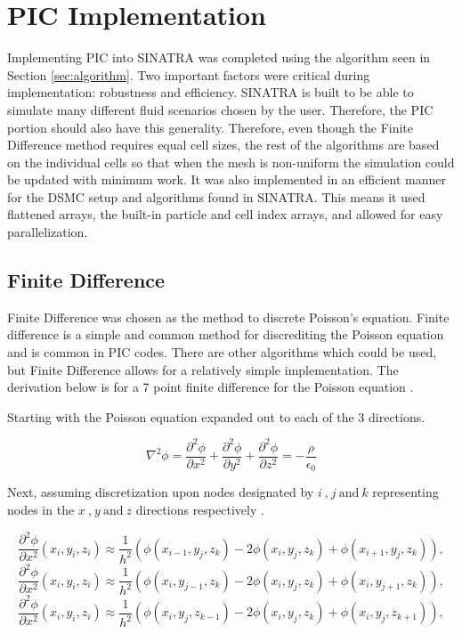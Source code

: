\section{PIC Implementation}

Implementing PIC into SINATRA was completed using the algorithm seen in Section \ref{sec:algorithm}. Two important factors were critical during implementation: robustness and efficiency. SINATRA is built to be able to simulate many different fluid scenarios chosen by the user. Therefore, the PIC portion should also have this generality. Therefore, even though the Finite Difference method requires equal cell sizes, the rest of the algorithms are based on the individual cells so that when the mesh is non-uniform the simulation could be updated with minimum work. It was also implemented in an efficient manner for the DSMC setup and algorithms found in SINATRA. This means it used flattened arrays, the built-in particle and cell index arrays, and allowed for easy parallelization. 

\subsection{Finite Difference}
\label{sec:finite_diff}

\indent Finite Difference was chosen as the method to discrete Poisson's equation. Finite difference is a simple and common method for discrediting the Poisson equation and is common in PIC codes. There are other algorithms which could be used, but Finite Difference allows for a relatively simple implementation. The derivation below is for a 7 point finite difference for the Poisson equation \cite{FD_GS} \cite{FDM}.

Starting with the Poisson equation expanded out to each of the 3 directions. 

\begin{equation}
    \label{eqn:poisson_expanded}
    \nabla^2 \phi = \frac{\partial^2 \phi}{\partial x^2} + \frac{\partial^2 \phi}{\partial y^2} + \frac{\partial^2 \phi}{\partial z^2} = - \frac{\rho}{\epsilon_0}
\end{equation}

Next, assuming discretization upon nodes designated by \(i \: \text{,} \: j \: \text{and} \: k\) representing nodes in the \(x \: \text{,} \: y \: \text{and} \: z\) directions respectively \cite{FD_GS}. 

\begin{equation}
    \label{eqn:x_partial}
    \frac{\partial^2 \phi}{\partial x^2}(x_i,y_i,z_i) \approx \frac{1}{h^2}(\phi(x_{i-1},y_j,z_k) - 2\phi(x_i,y_j,z_k) + \phi(x_{i+1},y_j,z_k)),
\end{equation}
\begin{equation}
    \label{eqn:y_partial}
    \frac{\partial^2 \phi}{\partial x^2}(x_i,y_i,z_i) \approx \frac{1}{h^2}(\phi(x_i,y_{j-1},z_k) - 2\phi(x_i,y_j,z_k) + \phi(x_i,y_{j+1},z_k)),
\end{equation}
\begin{equation}
    \label{eqn:z_partial}
    \frac{\partial^2 \phi}{\partial x^2}(x_i,y_i,z_i) \approx \frac{1}{h^2}(\phi(x_i,y_j,z_{k-1}) - 2\phi(x_i,y_j,z_k) + \phi(x_i,y_j,z_{k+1})),
\end{equation}

